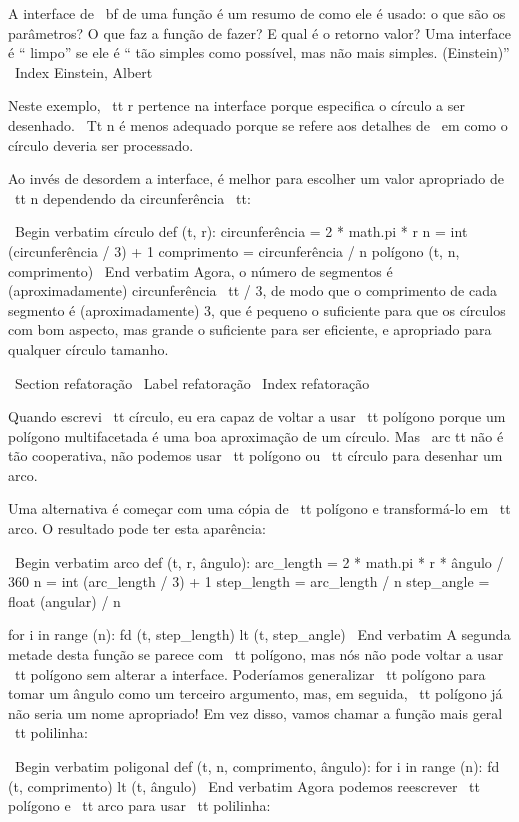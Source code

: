 \documentclass[10pt]{book}
\begin{document}
\begin {itemize}
{A interface de {\ bf} de uma função é um resumo de como ele é usado: o que
são os parâmetros? O que faz a função de fazer? E qual é o retorno
valor? Uma interface é `` limpo'' se ele é `` tão simples como
possível, mas não mais simples. (Einstein)''
\ Index {Einstein, Albert}

Neste exemplo, {\ tt r} pertence na interface porque
especifica o círculo a ser desenhado. {\ Tt n} é menos adequado
porque se refere aos detalhes de {\ em como} o círculo deveria
ser processado.

Ao invés de desordem a interface, é melhor
para escolher um valor apropriado de {\ tt n}
dependendo da circunferência {\ tt}:

\ Begin {verbatim}
círculo def (t, r):
    circunferência = 2 * math.pi * r
    n = int (circunferência / 3) + 1
    comprimento = circunferência / n
    polígono (t, n, comprimento)
\ End {verbatim}
%
Agora, o número de segmentos é (aproximadamente) {circunferência \ tt / 3},
de modo que o comprimento de cada segmento é (aproximadamente) 3, que é pequeno
o suficiente para que os círculos com bom aspecto, mas grande o suficiente para ser eficiente,
e apropriado para qualquer círculo tamanho.


\ Section {} refatoração
\ Label {} refatoração
\ Index {} refatoração

Quando escrevi {\ tt círculo}, eu era capaz de voltar a usar {\ tt polígono}
porque um polígono multifacetada é uma boa aproximação de um círculo.
Mas {\ arc tt} não é tão cooperativa, não podemos usar {\ tt polígono}
ou {\ tt círculo} para desenhar um arco.

Uma alternativa é começar com uma cópia
de {\ tt polígono} e transformá-lo em {\ tt arco}. O resultado
pode ter esta aparência:

\ Begin {verbatim}
arco def (t, r, ângulo):
    arc_length = 2 * math.pi * r * ângulo / 360
    n = int (arc_length / 3) + 1
    step_length = arc_length / n
    step_angle = float (angular) / n
    
    for i in range (n):
        fd (t, step_length)
        lt (t, step_angle)
\ End {verbatim}
%
A segunda metade desta função se parece com {\ tt polígono}, mas nós
não pode voltar a usar {\ tt polígono} sem alterar a interface. Poderíamos
generalizar {\ tt polígono} para tomar um ângulo como um terceiro argumento,
mas, em seguida, {\ tt polígono} já não seria um nome apropriado!
Em vez disso, vamos chamar a função mais geral {\ tt polilinha}:

\ Begin {verbatim}
poligonal def (t, n, comprimento, ângulo):
    for i in range (n):
        fd (t, comprimento)
        lt (t, ângulo)
\ End {verbatim}
%
Agora podemos reescrever {\ tt polígono} e {\ tt arco} para usar {\ tt polilinha}:

}
\end{itemize}
\end{document}
